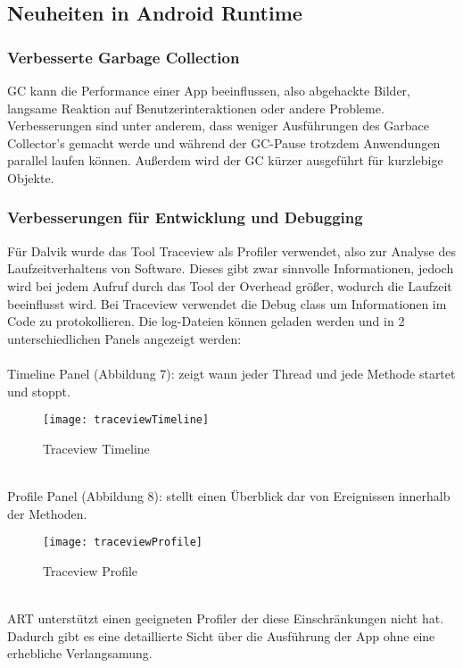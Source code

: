 \documentclass[11pt,conference,a4paper]{IEEEtran}
\begin{document}
\subsection{Neuheiten in Android Runtime\cite{11}\cite{12}}

\subsubsection{Verbesserte Garbage Collection}
GC kann die Performance einer App beeinflussen, also abgehackte Bilder, langsame Reaktion auf Benutzerinteraktionen oder andere Probleme. Verbesserungen sind unter anderem, dass weniger Ausführungen des Garbace Collector’s gemacht werde und während der GC-Pause trotzdem Anwendungen parallel laufen können. Außerdem wird der GC kürzer ausgeführt für kurzlebige Objekte.

\subsubsection{Verbesserungen für Entwicklung und Debugging}
Für Dalvik wurde das Tool Traceview als Profiler verwendet, also zur Analyse des Laufzeitverhaltens von Software. Dieses gibt zwar sinnvolle Informationen, jedoch wird bei jedem Aufruf durch das Tool der Overhead größer, wodurch die Laufzeit beeinflusst wird.
Bei Traceview verwendet die Debug class um Informationen im Code zu protokollieren. Die log-Dateien können geladen werden und in 2 unterschiedlichen Panels angezeigt werden:
\\
\\
Timeline Panel (Abbildung 7): zeigt wann jeder Thread und jede Methode startet und stoppt.
\\
\begin{figure*}
\centering
\texttt{[image: traceviewTimeline]}
\caption{Traceview Timeline\cite{12}}
\label{fig:traceviewTimeline}
\end{figure*}
\\
Profile Panel (Abbildung 8): stellt einen Überblick dar von Ereignissen innerhalb der Methoden.
\\
\begin{figure*}
\centering
\texttt{[image: traceviewProfile]}
\caption{Traceview Profile\cite{12}}
\label{fig:traceviewProfile}
\end{figure*}
\\
ART unterstützt einen geeigneten Profiler der diese Einschränkungen nicht hat. Dadurch gibt es eine detaillierte Sicht über die Ausführung der App ohne eine erhebliche Verlangsamung.
\end{document}
